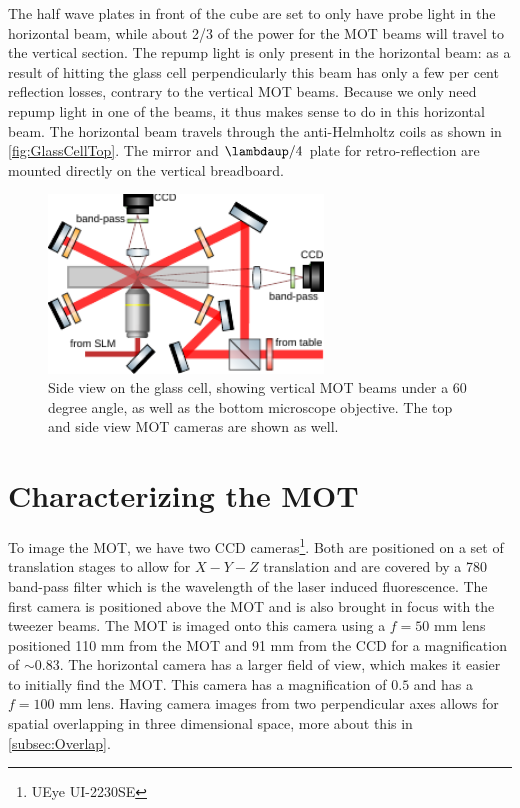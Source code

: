The half wave plates in front of the cube are set to only have probe light in the horizontal beam, while about 2/3 of the power for the MOT beams will travel to the vertical section. 
The repump light is only present in the horizontal beam: as a result of hitting the glass cell perpendicularly this beam has only a few per cent reflection losses, contrary to the vertical MOT beams. 
Because we only need repump light in one of the beams, it thus makes sense to do in this horizontal beam. 
The horizontal beam travels through the anti-Helmholtz coils as shown in \cref{fig:GlassCellTop}.
The mirror and $\lambdaup/4$ plate for retro-reflection are mounted directly on the vertical breadboard. 

\begin{figure}
    \centering
    \includegraphics[width=0.65\textwidth]{figures/MOTsideview.pdf}
    \caption{Side view on the glass cell, showing vertical MOT beams under a 60 degree angle, as well as the bottom microscope objective. 
    The top and side view MOT cameras are shown as well.}
    \label{fig:GlassCellSide}
\end{figure}


\section{Characterizing the MOT}\label{sec:MOTresult}

To image the MOT, we have two CCD cameras\footnote{UEye UI-2230SE}.
Both are positioned on a set of translation stages to allow for $X-Y-Z$ translation and are covered by a 780 band-pass filter which is the wavelength of the laser induced fluorescence.
The first camera is positioned above the MOT and is also brought in focus with the tweezer beams. 
The MOT is imaged onto this camera using a $f=50$ mm lens positioned 110 mm from the MOT and 91 mm from the CCD for a magnification of $\sim 0.83$.
The horizontal camera has a larger field of view, which makes it easier to initially find the MOT. 
This camera has a magnification of $0.5$ and has a $f=100$ mm lens. 
Having camera images from two perpendicular axes allows for spatial overlapping in three dimensional space, more about this in \cref{subsec:Overlap}.

